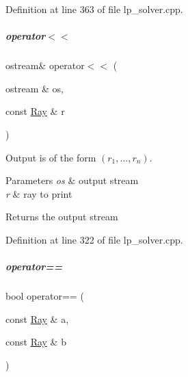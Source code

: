 Definition at line 363 of file lp\+\_\+solver.\+cpp.

\mbox{\label{group___c_l_s_solvers_a58ab17142b3c74a8d39c1e42dfa7a3f4}} 
\subparagraph{\texorpdfstring{operator$<$$<$}{operator<<}}
{\footnotesize\ttfamily ostream\& operator$<$$<$ (\begin{DoxyParamCaption}\item[{ostream \&}]{os,  }\item[{const \hyperlink{group___c_l_s_solvers_class_l_p___solvers_1_1_ray}{Ray} \&}]{r }\end{DoxyParamCaption})\hspace{0.3cm}{\ttfamily [friend]}}



Output is of the form $(r_1, \ldots, r_n)$. 


\begin{DoxyParams}{Parameters}
{\em os} & output stream \\
\hline
{\em r} & ray to print \\
\hline
\end{DoxyParams}
\begin{DoxyReturn}{Returns}
the output stream 
\end{DoxyReturn}


Definition at line 322 of file lp\+\_\+solver.\+cpp.

\mbox{\label{group___c_l_s_solvers_a12e1a3322151c1d6bbbce9efeeec40ae}} 
\subparagraph{\texorpdfstring{operator==}{operator==}}
{\footnotesize\ttfamily bool operator== (\begin{DoxyParamCaption}\item[{const \hyperlink{group___c_l_s_solvers_class_l_p___solvers_1_1_ray}{Ray} \&}]{a,  }\item[{const \hyperlink{group___c_l_s_solvers_class_l_p___solvers_1_1_ray}{Ray} \&}]{b }\end{DoxyParamCaption})\hspace{0.3cm}{\ttfamily [friend]}}



